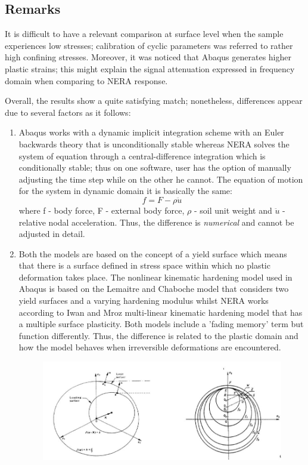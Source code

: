 \subsection{Remarks}
	It is difficult to have a relevant comparison at surface level when the sample experiences low stresses; calibration of cyclic parameters was referred to rather high confining stresses. Moreover, it was noticed that Abaqus generates higher plastic strains; this might explain the signal attenuation expressed in frequency domain when comparing to NERA response. 
	
	Overall, the results show a quite satisfying match; nonetheless, differences appear due to several factors as it follows:
	\begin{enumerate}
		\item Abaqus works with a dynamic implicit integration scheme with an Euler backwards theory that is unconditionally stable whereas NERA solves the system of equation through a central-difference integration which is conditionally stable; thus on one software, user has the option of manually adjusting the time step while on the other he cannot. The equation of motion for the system in dynamic domain it is basically the same:
		\begin{equation}
		f=F-\rho\ddot{u}
		\end{equation}
		where f - body force, F - external body force, $\rho$ - soil unit weight and $\ddot{u}$ - relative nodal acceleration. Thus, the difference is \textit{numerical} and cannot be adjusted in detail.
		\item Both the models are based on the concept of a yield surface which means that there is a surface defined in stress space within which no plastic deformation takes place. The nonlinear kinematic hardening model used in Abaqus is based on the Lemaitre and Chaboche \cite{lemaitre1994mechanics} model that considers two yield surfaces and a varying hardening modulus whilst NERA works according to Iwan and Mroz \cite{mroz1967description} multi-linear kinematic hardening model that has a multiple surface plasticity. Both models include a 'fading memory' term but function differently. Thus, the difference is related to the plastic domain and how the model behaves when irreversible deformations are encountered. 
		\begin{figure}
			\centering
			\includegraphics[width=0.7\linewidth]{"yield_srf"}

\end{figure}
\end{enumerate}
